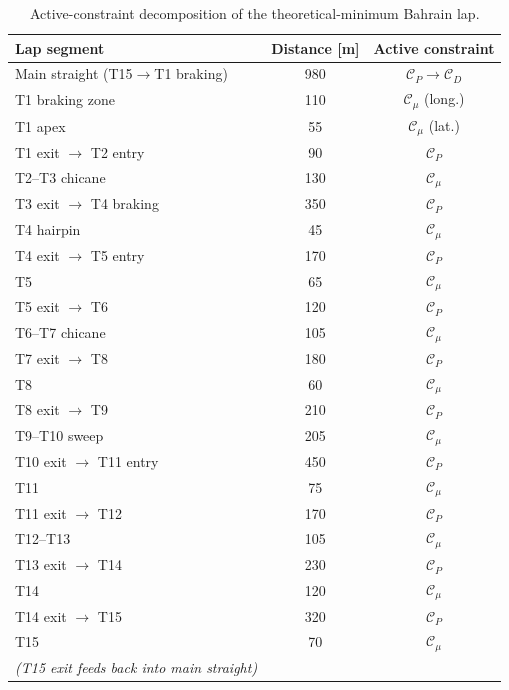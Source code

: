 \documentclass[11pt,twocolumn]{article}
\theoremstyle{definition}
\theoremstyle{remark}
\begin{document}
\begin{table}[!t]
\centering
\caption{Active-constraint decomposition of the theoretical-minimum Bahrain lap.}
\label{tab:active}
\begin{tabular}{lcc}
\toprule
Lap segment & Distance [m] & Active constraint\\
\midrule
Main straight (T15$\to$T1 braking)        & 980  & $\mathcal{C}_P \to \mathcal{C}_D$\\
T1 braking zone                            & 110  & $\mathcal{C}_\mu$ (long.)\\
T1 apex                                     & 55   & $\mathcal{C}_\mu$ (lat.)\\
T1 exit $\to$ T2 entry                      & 90   & $\mathcal{C}_P$\\
T2--T3 chicane                             & 130  & $\mathcal{C}_\mu$\\
T3 exit $\to$ T4 braking                   & 350  & $\mathcal{C}_P$\\
T4 hairpin                                  & 45   & $\mathcal{C}_\mu$\\
T4 exit $\to$ T5 entry                      & 170  & $\mathcal{C}_P$\\
T5                                          & 65   & $\mathcal{C}_\mu$\\
T5 exit $\to$ T6                            & 120  & $\mathcal{C}_P$\\
T6--T7 chicane                             & 105  & $\mathcal{C}_\mu$\\
T7 exit $\to$ T8                            & 180  & $\mathcal{C}_P$\\
T8                                          & 60   & $\mathcal{C}_\mu$\\
T8 exit $\to$ T9                            & 210  & $\mathcal{C}_P$\\
T9--T10 sweep                              & 205  & $\mathcal{C}_\mu$\\
T10 exit $\to$ T11 entry                   & 450  & $\mathcal{C}_P$\\
T11                                         & 75   & $\mathcal{C}_\mu$\\
T11 exit $\to$ T12                          & 170  & $\mathcal{C}_P$\\
T12--T13                                    & 105  & $\mathcal{C}_\mu$\\
T13 exit $\to$ T14                          & 230  & $\mathcal{C}_P$\\
T14                                         & 120  & $\mathcal{C}_\mu$\\
T14 exit $\to$ T15                          & 320  & $\mathcal{C}_P$\\
T15                                         & 70   & $\mathcal{C}_\mu$\\
\textit{(T15 exit feeds back into main straight)} & & \\
\bottomrule
\end{tabular}
\end{table}
\end{document}
